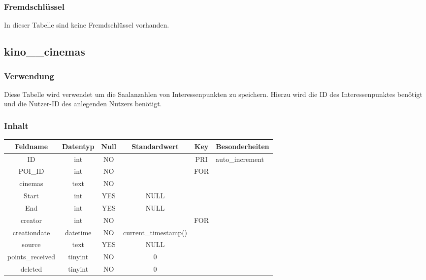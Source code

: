 \subsubsection{Fremdschlüssel}
In dieser Tabelle sind keine Fremdschlüssel vorhanden.
\subsection{kino\_\_cinemas}
\subsubsection{Verwendung} Diese Tabelle wird verwendet um die Saalanzahlen von Interessenpunkten zu speichern. Hierzu wird die ID des Interessenpunktes benötigt und die Nutzer-ID des anlegenden Nutzers benötigt.
\subsubsection{Inhalt}
\begin{table}[H]
	\begin{tabular}{|c|c|c|c|c|p{3.5cm}|}
		\hline
		\textbf{Feldname} & \textbf{Datentyp} & \textbf{Null} & \textbf{Standardwert} & \textbf{Key}   & \textbf{Besonderheiten} \\ \hline
		ID & int & NO &  & PRI & auto\_increment \\ \hline
		POI\_ID & int & NO &  & FOR &  \\ \hline
		cinemas & text & NO &  &  &  \\ \hline
		Start & int & YES & NULL &  &  \\ \hline
		End & int & YES & NULL &  &  \\ \hline
		creator & int & NO &  & FOR &  \\ \hline
		creationdate & datetime & NO & current\_timestamp() &  &  \\ \hline
		source & text & YES & NULL &  &  \\ \hline
		points\_received & tinyint & NO & 0 &  &  \\ \hline
		deleted & tinyint & NO & 0 &  &  \\ \hline
	\end{tabular}
\end{table}
